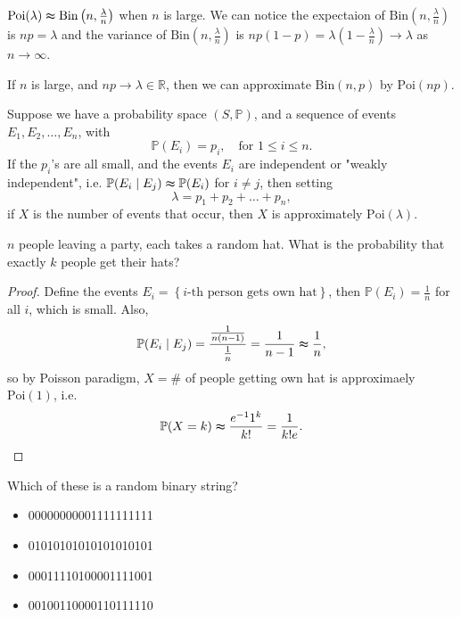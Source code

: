 \begin{remark}
    \(\mathrm{Poi}(\lambda ) \thickapprox \mathrm{Bin} \left( n, \frac{\lambda}{n} \right)   \) when \(n\) is large. We can notice the expectaion of \(\mathrm{Bin} \left( n, \frac{\lambda}{n} \right)  \) is \(n p = \lambda \) and the variance of \(\mathrm{Bin} \left( n, \frac{\lambda}{n} \right)  \) is \(np(1 - p) = \lambda \left( 1 - \frac{\lambda}{n} \right) \to \lambda  \) as \(n \to \infty\).      
\end{remark}

\begin{remark}
    If \(n\) is large, and \(np \to \lambda \in \mathbb{R} \), then we can approximate \(\mathrm{Bin}(n, p) \) by \(\mathrm{Poi}(np) \).    
\end{remark}

\begin{eg}
    Suppose we have a probability space \((S, \mathbb{P})\), and a sequence of events \(E_1, E_2, \dots , E_n\), with 
    \[
        \mathbb{P} (E_i) = p_i, \quad \text{for } 1 \le i \le n.
    \]  
    If the \(p_i\)'s are all small, and the events \(E_i\) are independent or "weakly independent", i.e. \(\mathbb{P} (E_i \mid E_j) \thickapprox \mathbb{P} (E_i)\) for \(i \neq j\), then setting 
    \[
        \lambda = p_1 + p_2 + \dots + p_n,
    \]    
    if \(X\) is the number of events that occur, then \(X\) is approximately \(\mathrm{Poi}(\lambda ) \).   
\end{eg}

\begin{eg}
    \(n\) people leaving a party, each takes a random hat. What is the probability that exactly \(k\) people get their hats?  
\end{eg}
\begin{proof}
    Define the events \(E_i = \left\{ i\text{-th person gets own hat}  \right\} \), then \(\mathbb{P} (E_i) = \frac{1}{n}\) for all \(i\), which is small. Also, 
    \[
        \mathbb{P} (E_i \mid E_j) = \frac{\frac{1}{n(n-1)}}{\frac{1}{n}} = \frac{1}{n-1} \thickapprox \frac{1}{n},
    \]  
    so by Poisson paradigm, \(X = \# \) of people getting own hat is approximaely \(\mathrm{Poi}(1) \), i.e. 
    \[
        \mathbb{P} (X = k) \thickapprox \frac{e^{-1} 1^k}{k!} = \frac{1}{k! e}.
    \]    
\end{proof}

\begin{eg}
    Which of these is a random binary string?
    \begin{itemize}
        \item [(a)] 00000000001111111111
        \item [(b)] 01010101010101010101
        \item [(c)] 00011110100001111001
        \item [(d)] 00100110000110111110
    \end{itemize}
\end{eg}

